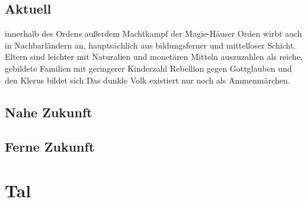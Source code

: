 \section{Aktuell}
\begin{outline}
	\1 innerhalb des Ordens außerdem Machtkampf der Magie-Häuser
	\1 Orden wirbt auch in Nachbarländern an, hauptsächlich aus bildungsferner und mittelloser Schicht.\\
	Eltern sind leichter mit Naturalien und monetären Mitteln auszuzahlen als reiche, gebildete Familien mit geringerer Kinderzahl
	\1 Rebellion gegen Gottglauben und den Klerus bildet sich
	\1 Das dunkle Volk existiert nur noch als Ammenmärchen.
\end{outline}

\section{Nahe Zukunft}

\section{Ferne Zukunft}

\chapter{Tal}